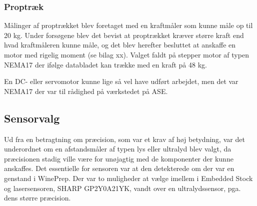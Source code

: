 \subsubsection{Proptræk}
Målinger af proptrækket blev foretaget med en kraftmåler som kunne måle op til 20 kg. Under forsøgene blev det bevist at proptrækket kræver større kraft end hvad kraftmåleren kunne måle, og det blev herefter besluttet at anskaffe en motor med rigelig moment (se bilag xx). Valget faldt på stepper motor af typen NEMA17 der ifølge databladet kan trække med en kraft på 48 kg. 

En DC- eller servomotor kunne lige så vel have udført arbejdet, men det var NEMA17 der var til rådighed på værkstedet på ASE.

\subsection{Sensorvalg}
Ud fra en betragtning om præcision, som var et krav af høj betydning, var det underordnet om en afstandsmåler af typen lys eller ultralyd blev valgt, da præcisionen stadig ville være for unøjagtig med de komponenter der kunne anskaffes. Det essentielle for sensoren var at den detekterede om der var en genstand i WinePrep. Der var to muligheder at vælge imellem i Embedded Stock og lasersensoren, SHARP GP2Y0A21YK, vandt over en ultralydssensor, pga. dens større præcision.